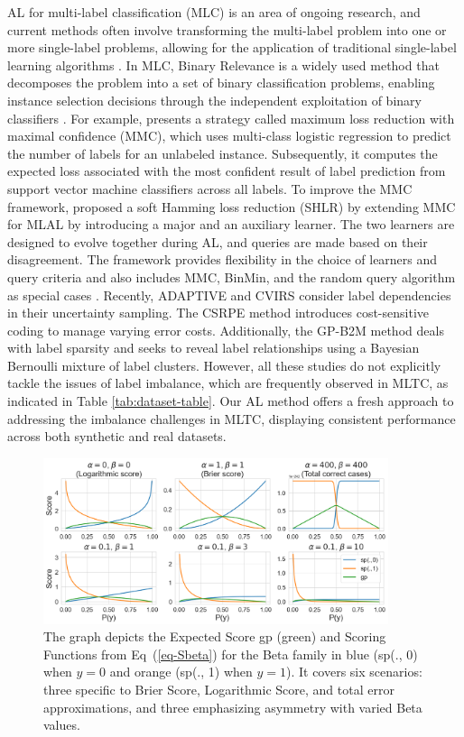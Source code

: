 \documentclass[letterpaper]{article} %
\begin{document}
AL for multi-label classification (MLC) is an area of ongoing research, and current methods often involve transforming the multi-label problem into one or more single-label problems, allowing for the application of traditional single-label learning algorithms \cite{Cherman2019, REYES2018494}. In MLC, Binary Relevance is a widely used method that decomposes the problem into a set of binary classification problems, enabling instance selection decisions through the independent exploitation of binary classifiers \cite{pmlr-v97-shi19b}.
For example, \citet{mmc2009} presents a strategy called maximum loss reduction with maximal confidence (MMC), which uses multi-class logistic regression to predict the number of labels for an unlabeled instance. Subsequently, it computes the expected
loss associated with the most
confident result of label prediction from support vector machine classifiers across all labels.
To improve the MMC framework, \citet{pmlr-v20-hung11} proposed a soft Hamming loss reduction (SHLR) by extending MMC for MLAL by introducing a major and an auxiliary learner. The two learners are designed to evolve together during AL, and queries are made based on their disagreement. The framework provides flexibility in the choice of learners and query criteria and also includes MMC, BinMin, and the random query algorithm as special cases \cite{10.1007/978-3-319-97304-3_73, REYES2018494}.
Recently, ADAPTIVE \cite{adaptive2013} and CVIRS \cite{REYES2018494}  consider
label dependencies in their uncertainty sampling.
The CSRPE \cite{10.1007/978-3-319-93034-3_12} method introduces cost-sensitive coding to manage varying error costs. Additionally, the GP-B2M \cite{gaupb2_2021} method deals with label sparsity and seeks to reveal label relationships using a Bayesian Bernoulli mixture of label clusters.
However, all these studies do not explicitly tackle the issues of label imbalance, which are frequently observed in MLTC, as indicated in Table \ref{tab:dataset-table}.
Our AL method offers a fresh approach to addressing the imbalance challenges in MLTC, displaying consistent performance across both synthetic and real datasets.

\begin{figure}[!t]
\centering
    \includegraphics[width=0.9\textwidth]{figures/betagp_blt.png}
    \caption{
    The graph depicts the Expected Score gp (green) and Scoring Functions from Eq~(\ref{eq-Sbeta}) for the Beta family in blue (sp(., 0) when $y=0$ and orange (sp(., 1) when $y=1$). It covers six scenarios: three specific to Brier Score, Logarithmic Score, and total error approximations, and three emphasizing asymmetry with varied Beta values.
    }
    \label{fig:betagp_blt}
\end{figure}
\end{document}
